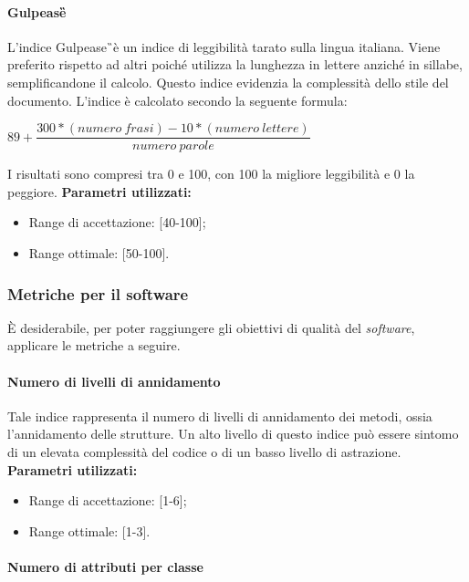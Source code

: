 \paragraph{Gulpease\G}
L'indice Gulpease\G\ è un indice di leggibilità tarato sulla lingua italiana. 
Viene preferito rispetto ad altri poiché utilizza la lunghezza in lettere 
anziché in sillabe, semplificandone il calcolo. Questo indice evidenzia la 
complessità dello stile del documento.\newline
L'indice è calcolato secondo la seguente formula:
\begin{center}
$ 89+ \dfrac{300*(numero\ frasi)-10*(numero\ lettere)}{numero\ parole} $
\end{center}
I risultati sono compresi tra 0 e 100, con 100 la migliore leggibilità e 0 la peggiore. \newline \newline \textbf{Parametri utilizzati:}
\begin{itemize}
	\item Range di accettazione: [40-100];
	\item Range ottimale: [50-100].
\end{itemize}

\subsubsection{Metriche per il software}
È desiderabile, per poter raggiungere gli obiettivi di qualità del \textit{software}, 
applicare le metriche a seguire.

\paragraph{Numero di livelli di annidamento}

Tale indice rappresenta il numero di livelli di annidamento dei metodi, ossia l'annidamento delle strutture. Un alto livello di questo indice può essere sintomo di un elevata complessità del codice o di un basso livello di astrazione.\newline \newline
\textbf{Parametri utilizzati:}
\begin{itemize}
	\item Range di accettazione: [1-6];
	\item Range ottimale: [1-3].
\end{itemize}

\paragraph{Numero di attributi per classe}

